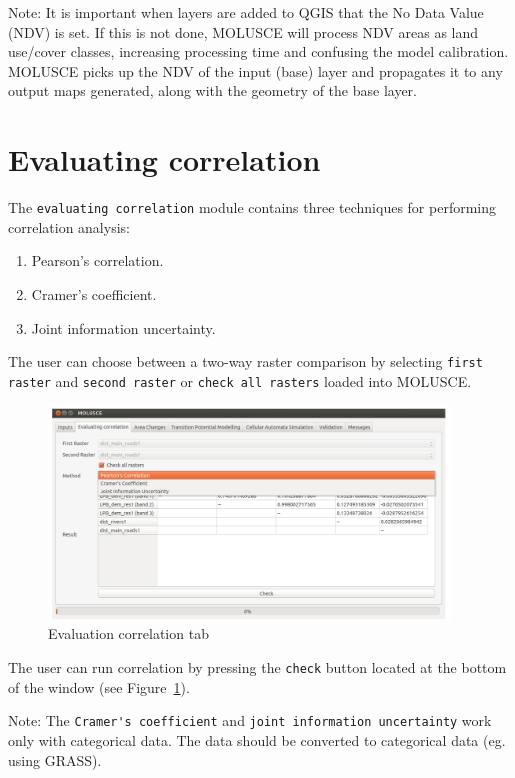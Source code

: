 \documentclass{report}
\begin{document}
Note: It is important when layers are added to QGIS that the No Data Value (NDV) is set. If this is
not done, MOLUSCE will process NDV areas as land use/cover classes, increasing processing time
and confusing the model calibration. MOLUSCE picks up the NDV of the input (base) layer and
propagates it to any output maps generated, along with the geometry of the base layer.

\section{Evaluating correlation}

The \verb+evaluating correlation+ module contains three techniques for performing correlation analysis:
\begin{enumerate}
  \item Pearson's correlation.
  \item Cramer's coefficient.
  \item Joint information uncertainty.
\end{enumerate}

The user can choose between a two-way raster comparison by selecting \verb+first raster+ and \verb+second raster+
or \verb+check all rasters+ loaded into MOLUSCE.

\begin{figure}[h!]
\centering
\includegraphics[width=0.95\textwidth]{img/correlation_tab.png}
\caption{Evaluation correlation tab}
\label{fig:correlation_tab}
\end{figure}

The user can run correlation by pressing the \verb+check+ button located at the bottom of the window (see Figure~\ref{fig:correlation_tab}).

Note: The \verb+Cramer's coefficient+ and \verb+joint information uncertainty+ work only with categorical data.
The data should be converted to categorical data (eg. using GRASS).
\end{document}

